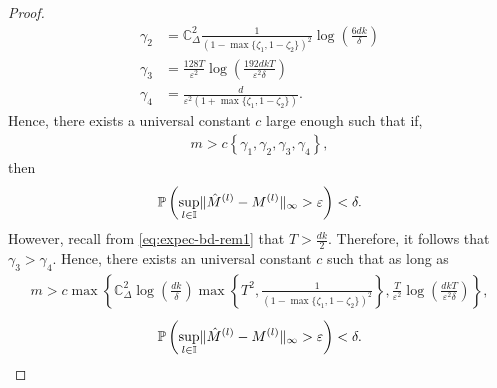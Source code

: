 \documentclass[opre,sglanonrev]{informs4}
\numberwithin{equation}{section}
\newcommand{\lp}{\left(}
\newcommand{\rp}{\right)}
\newcommand{\lc}{\left\{}
\newcommand{\rc}{\right\}}
\newcommand{\Cbb}{\mathbb{C}}
\newcommand{\Ibb}{\mathbb{I}}
\newcommand{\Pbb}{\mathbb{P}}
\newcommand{\constant}{\Cbb}
\newcommand{\prob}{\Pbb}
\newcommand{\eps}{\varepsilon}
\renewcommand{\epsilon}{\eps}
\begin{document}
\begin{APPENDICES}
\begin{proof}
\begin{align*}
    \gamma_2 & = \constant_\Delta^2\frac{1}{\lp 1-\max\{\zeta_1,1-\zeta_2\}\rp^2}\log\lp \frac{6dk}{\delta} \rp\\
    \gamma_3 & =\frac{128T}{\eps^2} \log\lp \frac{192dkT}{\epsilon^2\delta} \rp\\
    \gamma_4 & =\frac{d}{\epsilon^2\left({1+\max\{\zeta_1,1-\zeta_2\}}\right)}. 
\end{align*}
Hence, there exists a universal constant $c$ large enough such that if,
\begin{align*}
m>c\lc \gamma_1,\gamma_2,\gamma_3,\gamma_4 \rc,
\end{align*}
then 
\begin{align}
  \prob\left(\underset{l\in \Ibb}{\sup} \|\Hat{M}^{(l)}-M^{(l)}\|_{\infty}>\epsilon  \right)< \delta.
\end{align}
However, recall from \cref{eq:expec-bd-rem1} that $T>\frac{dk}{2}$. 
Therefore, it follows that $\gamma_3>\gamma_4$.
Hence, there exists an universal constant $c$ such that as long as
\begin{align*}
  m>c\max\left\{\constant_\Delta^2\log\lp \frac{dk}{\delta} \rp\max\lc {T}^2, \frac{1}{\lp 1-\max\{\zeta_1,1-\zeta_2\}\rp^2}\rc,\frac{T}{\eps^2}\log\lp \frac{dkT}{\epsilon^2\delta} \rp \right\},
\end{align*} 
\begin{align}
  \prob\left(\underset{l\in \Ibb}{\sup} \|\Hat{M}^{(l)}-M^{(l)}\|_{\infty}>\epsilon  \right)< \delta.
\end{align}
\end{proof}




\end{APPENDICES}
\end{document}

